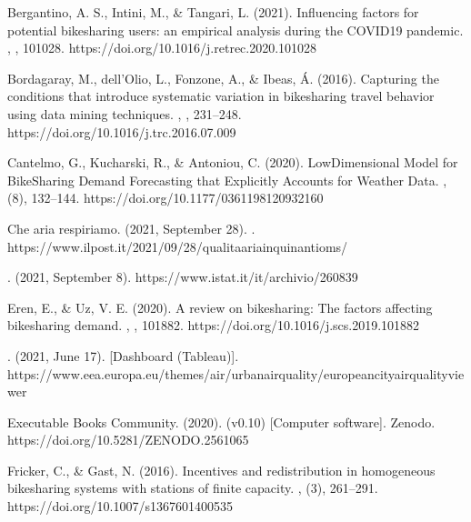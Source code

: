 \documentclass[letterpaper,10pt,english]{jupyterBook}
\begin{document}
\sphinxAtStartPar
Bergantino, A. S., Intini, M., \& Tangari, L. (2021). Influencing factors for potential bike\sphinxhyphen{}sharing users: an empirical analysis during the COVID\sphinxhyphen{}19 pandemic. , , 101028. https://doi.org/10.1016/j.retrec.2020.101028

\sphinxAtStartPar
Bordagaray, M., dell’Olio, L., Fonzone, A., \& Ibeas, Á. (2016). Capturing the conditions that introduce systematic variation in bike\sphinxhyphen{}sharing travel behavior using data mining techniques. , , 231–248. https://doi.org/10.1016/j.trc.2016.07.009

\sphinxAtStartPar
Cantelmo, G., Kucharski, R., \& Antoniou, C. (2020). Low\sphinxhyphen{}Dimensional Model for Bike\sphinxhyphen{}Sharing Demand Forecasting that Explicitly Accounts for Weather Data. , (8), 132–144. https://doi.org/10.1177/0361198120932160

\sphinxAtStartPar
Che aria respiriamo. (2021, September 28). . https://www.ilpost.it/2021/09/28/qualita\sphinxhyphen{}aria\sphinxhyphen{}inquinanti\sphinxhyphen{}oms/

\sphinxAtStartPar
{}. (2021, September 8). https://www.istat.it/it/archivio/260839

\sphinxAtStartPar
Eren, E., \& Uz, V. E. (2020). A review on bike\sphinxhyphen{}sharing: The factors affecting bike\sphinxhyphen{}sharing demand. , , 101882. https://doi.org/10.1016/j.scs.2019.101882

\sphinxAtStartPar
{}. (2021, June 17). {[}Dashboard (Tableau){]}. https://www.eea.europa.eu/themes/air/urban\sphinxhyphen{}air\sphinxhyphen{}quality/european\sphinxhyphen{}city\sphinxhyphen{}air\sphinxhyphen{}quality\sphinxhyphen{}viewer

\sphinxAtStartPar
Executable Books Community. (2020).  (v0.10) {[}Computer software{]}. Zenodo. https://doi.org/10.5281/ZENODO.2561065

\sphinxAtStartPar
Fricker, C., \& Gast, N. (2016). Incentives and redistribution in homogeneous bike\sphinxhyphen{}sharing systems with stations of finite capacity. , (3), 261–291. https://doi.org/10.1007/s13676\sphinxhyphen{}014\sphinxhyphen{}0053\sphinxhyphen{}5
\end{document}
